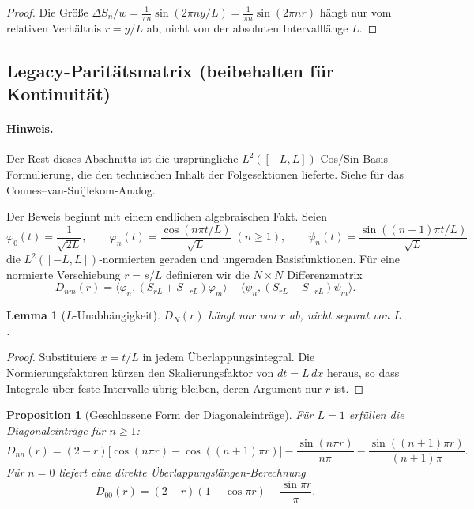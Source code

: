 \documentclass[11pt,a4paper]{article}
\newtheorem{lemma}[lemma]{Lemma}
\newtheorem{proposition}[proposition]{Proposition}
\theoremstyle{remark}
\theoremstyle{plain}
\begin{document}
\begin{proof}
Die Größe $\Delta S_n / w = \frac{1}{\pi n}\sin(2\pi n y/L) = \frac{1}{\pi n}\sin(2\pi n r)$ hängt nur vom relativen Verhältnis $r = y/L$ ab, nicht von der absoluten Intervalllänge $L$.
\end{proof}

\subsection{Legacy-Paritätsmatrix (beibehalten für Kontinuität)}
\label{subsec:parity-legacy}

\paragraph{Hinweis.} Der Rest dieses Abschnitts ist die ursprüngliche $L^2([-L,L])$-Cos/Sin-Basis-Formulierung, die den technischen Inhalt der Folgesektionen lieferte. Siehe  für das Connes--van-Suijlekom-Analog.

Der Beweis beginnt mit einem endlichen algebraischen Fakt. Seien
\[
  \varphi_0(t)=\frac{1}{\sqrt{2L}},
  \qquad
  \varphi_n(t)=\frac{\cos(n\pi t/L)}{\sqrt L}\;(n\geq 1),
  \qquad
  \psi_n(t)=\frac{\sin((n+1)\pi t/L)}{\sqrt L}
\]
die $L^2([-L,L])$-normierten geraden und ungeraden Basisfunktionen. Für eine normierte Verschiebung $r=s/L$ definieren wir die $N\times N$ Differenzmatrix
\[
  D_{nm}(r)=
  \langle\varphi_n,(S_{rL}+S_{-rL})\varphi_m\rangle
  -
  \langle\psi_n,(S_{rL}+S_{-rL})\psi_m\rangle .
\]

\begin{lemma}[$L$-Unabhängigkeit]
\label{lem:L-independence}
$D_N(r)$ hängt nur von $r$ ab, nicht separat von $L$.
\end{lemma}

\begin{proof}
Substituiere $x=t/L$ in jedem Überlappungsintegral. Die Normierungsfaktoren kürzen den Skalierungsfaktor von $dt=L\,dx$ heraus, so dass Integrale über feste Intervalle übrig bleiben, deren Argument nur $r$ ist.
\end{proof}

\begin{proposition}[Geschlossene Form der Diagonaleinträge]
\label{prop:diagonal}
Für $L=1$ erfüllen die Diagonaleinträge für $n\geq 1$:
\[
  D_{nn}(r)
  =(2-r)\bigl[\cos(n\pi r)-\cos((n+1)\pi r)\bigr]
  -\frac{\sin(n\pi r)}{n\pi}
  -\frac{\sin((n+1)\pi r)}{(n+1)\pi}.
\]
Für $n=0$ liefert eine direkte Überlappungslängen-Berechnung
\[
  D_{00}(r)=(2-r)(1-\cos\pi r)-\frac{\sin\pi r}{\pi}.
\]
\end{proposition}
\end{document}
